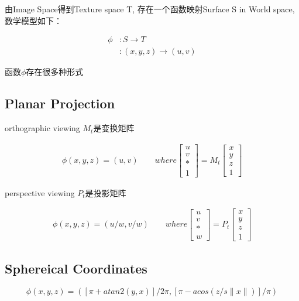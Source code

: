 由Image Space得到Texture space T, 存在一个函数映射Surface S in World space, 数学模型如下：

\begin{align*}
    \phi &: S \rightarrow T \\
    &: (x,y,z) \rightarrow (u,v)
\end{align*}

函数$\phi$存在很多种形式

\subsection{Planar Projection}

orthographic viewing $M_{t}$是变换矩阵

\begin{align*}
    \phi(x,y,z) = (u,v) \qquad where 
    \begin{bmatrix} u \\ v \\ * \\ 1 \end{bmatrix} = M_{t} 
    \begin{bmatrix} x \\ y \\ z \\ 1 \end{bmatrix}
\end{align*}

perspective viewing $P_{t}$是投影矩阵

\begin{align*}
    \phi(x,y,z) = (u/w,v/w) \qquad where 
    \begin{bmatrix} u \\ v \\ * \\ w \end{bmatrix} = P_{t} 
    \begin{bmatrix} x \\ y \\ z \\ 1 \end{bmatrix}
\end{align*}


\subsection{Sphereical Coordinates}

\begin{equation}
    \phi(x,y,z) = ([\pi+atan2(y,x)]/2\pi,[\pi-acos(z/s\|x\|)]/\pi)
\end{equation}

